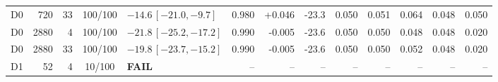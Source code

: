 \begin{longtable}{crrcp{33mm}rrrrrrrr}
D0 & 720 & 33 & 100/100 & \(-14.6\,[-21.0,-9.7]\) & 0.980 & +0.046 & -23.3 & 0.050 & 0.051 & 0.064 & 0.048 & 0.050\\
D0 & 2880 & 4 & 100/100 & \(-21.8\,[-25.2,-17.2]\) & 0.990 & -0.005 & -23.6 & 0.050 & 0.050 & 0.048 & 0.048 & 0.020\\
D0 & 2880 & 33 & 100/100 & \(-19.8\,[-23.7,-15.2]\) & 0.990 & -0.005 & -23.6 & 0.050 & 0.050 & 0.052 & 0.048 & 0.020\\
D1 & 52 & 4 & 10/100 & \textbf{FAIL} & -- & -- & -- & -- & -- & -- & -- & --\\

\end{longtable}
